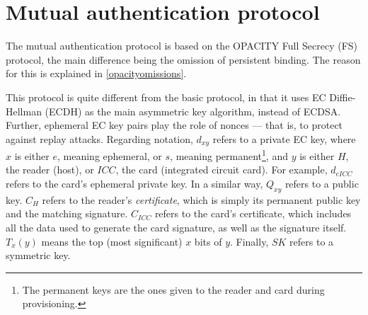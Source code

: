 \documentclass[12pt,a4paper,twoside,openright]{report}
\begin{document}
\section{Mutual authentication protocol}
\label{mutualauth}

The mutual authentication protocol is based on the OPACITY \cite{OPACITY} Full Secrecy (FS) protocol, the main difference being the omission of persistent binding. The reason for this is explained in \autoref{opacityomissions}.

This protocol is quite different from the basic protocol, in that it uses EC Diffie-Hellman (ECDH) as the main asymmetric key algorithm, instead of ECDSA. Further, ephemeral EC key pairs play the role of nonces --- that is, to protect against replay attacks. Regarding notation, $d_{xy}$ refers to a private EC key, where $x$ is either $e$, meaning ephemeral, or $s$, meaning permanent\footnote{The permanent keys are the ones given to the reader and card during provisioning.}, and $y$ is either $H$, the reader (host), or $ICC$, the card (integrated circuit card). For example, $d_{eICC}$ refers to the card's ephemeral private key. In a similar way, $Q_{xy}$ refers to a public key. $C_{H}$ refers to the reader's \emph{certificate}, which is simply its permanent public key and the matching signature. $C_{ICC}$ refers to the card's certificate, which includes all the data used to generate the card signature, as well as the signature itself. $T_x(y)$ means the top (most significant) $x$ bits of $y$. Finally, $SK$ refers to a symmetric key.
\end{document}

